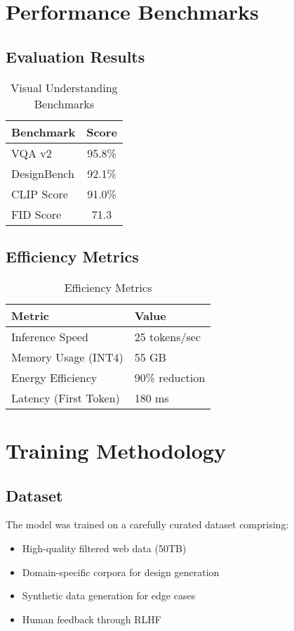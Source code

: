 \documentclass[11pt,a4paper]{article}
\begin{document}
\section{Performance Benchmarks}

\subsection{Evaluation Results}


\begin{table}[H]
\centering
\begin{tabular}{lc}
\toprule
\textbf{Benchmark} & \textbf{Score} \\
\midrule
VQA v2 & 95.8\% \\
DesignBench & 92.1\% \\
CLIP Score & 91.0\% \\
FID Score & 71.3 \\
\bottomrule
\end{tabular}
\caption{Visual Understanding Benchmarks}
\end{table}

\subsection{Efficiency Metrics}

\begin{table}[H]
\centering
\begin{tabular}{ll}
\toprule
\textbf{Metric} & \textbf{Value} \\
\midrule
Inference Speed & 25 tokens/sec \\
Memory Usage (INT4) & 55 GB \\
Energy Efficiency & 90\% reduction \\
Latency (First Token) & 180 ms \\
\bottomrule
\end{tabular}
\caption{Efficiency Metrics}
\end{table}

\section{Training Methodology}

\subsection{Dataset}
The model was trained on a carefully curated dataset comprising:
\begin{itemize}
    \item High-quality filtered web data (50TB)
    \item Domain-specific corpora for design generation
    \item Synthetic data generation for edge cases
    \item Human feedback through RLHF
\end{itemize}
\end{document}
